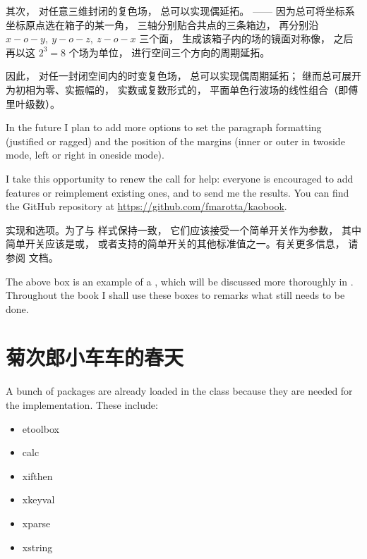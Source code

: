 
其次， 对任意三维封闭的复色场， 总可以实现偶延拓。 —— 因为总可将坐标系坐标原点选在箱子的某一角， 三轴分别贴合共点的三条箱边， 
再分别沿 $ x-o-y,\ y-o-z,\ z-o-x $ 三个面， 生成该箱子内的场的镜面对称像， 之后再以这 $ 2^3 = 8 $ 个场为单位， 
进行空间三个方向的周期延拓。

因此， 对任一封闭空间内的时变复色场， 总可以实现偶周期延拓； 继而总可展开为初相为零、实振幅的， 实数或复数形式的， 
平面单色行波场的线性组合（即傅里叶级数）。



In the future I plan to add more options to set the paragraph formatting
(justified or ragged) and the position of the margins (inner or outer in
twoside mode, left or right in oneside mode).

I take this opportunity to renew the call for help: everyone is
encouraged to add features or reimplement existing ones, and to send me
the results. You can find the GitHub repository at
\url{https://github.com/fmarotta/kaobook}.

\begin{kaobox}[frametitle=To Do]
实现和选项。为了与\KOMAScript\xspace 样式保持一致， 它们应该接受一个简单开关作为参数， 其中简单开关应该是或， 或者\KOMAScript 支持的简单开关的其他标准值之一。有关更多信息， 请参阅\KOMAScript\xspace 文档。
\end{kaobox}

The above box is an example of a , which will be
discussed more thoroughly in . Throughout the book I
shall use these boxes to remarks what still needs to be done.

\section{菊次郎小车车的春天}

A bunch of packages are already loaded in the class because they are
needed for the implementation. These include:

\begin{itemize}
	\item etoolbox
	\item calc
	\item xifthen
	\item xkeyval
	\item xparse
	\item xstring
\end{itemize}

